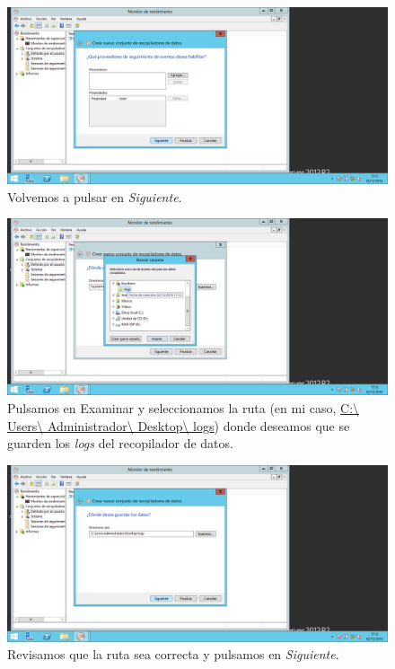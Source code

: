 \begin{figure}[H]
	\centering
	\includegraphics[scale=0.4]{recopilador-6.png}
	\caption{Volvemos a pulsar en \textit{Siguiente}.}
\end{figure}

\begin{figure}[H]
	\centering
	\includegraphics[scale=0.4]{recopilador-7.png}
	\caption{Pulsamos en Examinar y seleccionamos la ruta (en mi caso, \protect\url{C:\ Users\ Administrador\ Desktop\ logs}) donde deseamos que se guarden los \textit{logs} del recopilador de datos.}
\end{figure}

\begin{figure}[H]
	\centering
	\includegraphics[scale=0.4]{recopilador-8.png}
	\caption{Revisamos que la ruta sea correcta y pulsamos en \textit{Siguiente}.}
\end{figure}

